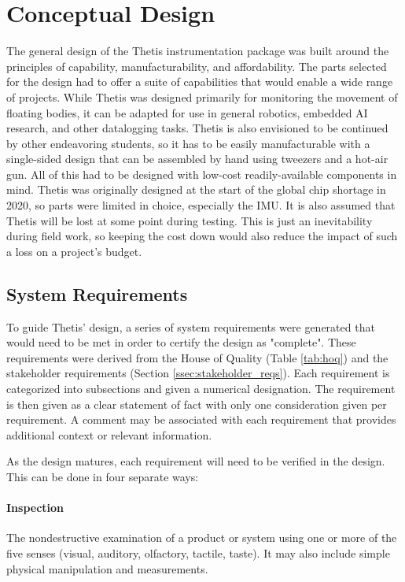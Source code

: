 \section{Conceptual Design} \label{sec:conceptual_design}
The general design of the Thetis instrumentation package was built around the principles of capability, manufacturability, and affordability.
The parts selected for the design had to offer a suite of capabilities that would enable a wide range of projects.
While Thetis was designed primarily for monitoring the movement of floating bodies, it can be adapted for use in general robotics, embedded AI research, and other datalogging tasks.
Thetis is also envisioned to be continued by other endeavoring students, so it has to be easily manufacturable with a single-sided design that can be assembled by hand using tweezers and a hot-air gun.
All of this had to be designed with low-cost readily-available components in mind.
Thetis was originally designed at the start of the global chip shortage in 2020, so parts were limited in choice, especially the IMU.
It is also assumed that Thetis will be lost at some point during testing.
This is just an inevitability during field work, so keeping the cost down would also reduce the impact of such a loss on a project's budget.

\subsection{System Requirements} \label{ssec:system_requirements}
To guide Thetis' design, a series of system requirements were generated that would need to be met in order to certify the design as "complete".
These requirements were derived from the House of Quality (Table \ref{tab:hoq}) and the stakeholder requirements (Section \ref{ssec:stakeholder_reqs}).
Each requirement is categorized into subsections and given a numerical designation.
The requirement is then given as a clear statement of fact with only one consideration given per requirement.
A comment may be associated with each requirement that provides additional context or relevant information.

As the design matures, each requirement will need to be verified in the design. This can be done in four separate ways:

\paragraph*{Inspection} The nondestructive examination of a product or system using one or more of the five senses (visual, auditory, olfactory, tactile, taste). 
It may also include simple physical manipulation and measurements.

